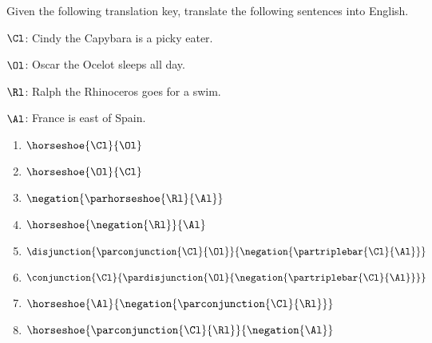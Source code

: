 Given the following translation key, translate the following \GSL{} sentences into English. 
\begin{description}[itemsep=0em]
	\item[Translation Key:] \hfill{} 
	\begin{description}[itemsep=0em]
		\item $\Cl$: Cindy the Capybara is a picky eater.
		\item $\Ol$: Oscar the Ocelot sleeps all day.
		\item $\Rl$: Ralph the Rhinoceros goes for a swim.
		\item $\Al$: France is east of Spain. 
	\end{description} 
\end{description}
\begin{multicols}{2}
	\begin{enumerate}
		\item $\horseshoe{\Cl}{\Ol}$
		\item $\horseshoe{\Ol}{\Cl}$
		\item $\negation{\parhorseshoe{\Rl}{\Al}}$
		\item $\horseshoe{\negation{\Rl}}{\Al}$
		\item $\disjunction{\parconjunction{\Cl}{\Ol}}{\negation{\partriplebar{\Cl}{\Al}}}$
		\item $\conjunction{\Cl}{\pardisjunction{\Ol}{\negation{\partriplebar{\Cl}{\Al}}}}$
		\item $\horseshoe{\Al}{\negation{\parconjunction{\Cl}{\Rl}}}$
		\item $\horseshoe{\parconjunction{\Cl}{\Rl}}{\negation{\Al}}$
	\end{enumerate}
\end{multicols}

